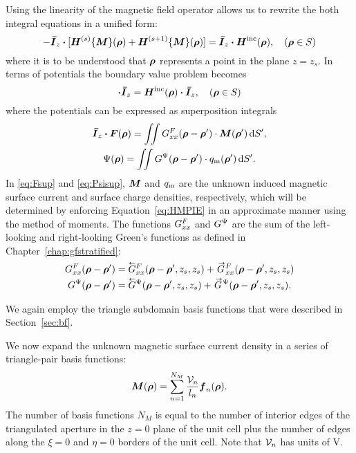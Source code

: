 Using the linearity of the magnetic field operator allows
us to rewrite the both integral equations in a unified form:
\begin{equation}
-\boldsymbol{\bar{I}}_z \boldsymbol{\cdot} [\boldsymbol{H}^{(s)}\{\boldsymbol{M}\}(\boldsymbol{\rho}) + 
\boldsymbol{H}^{(s+1)}\{\boldsymbol{M}\}(\boldsymbol{\rho})] = 
\boldsymbol{\bar{I}}_z \boldsymbol{\cdot} \boldsymbol{H}^{\text{inc}}(\boldsymbol{\rho}), \quad (\boldsymbol{\rho} \in S)
  \label{eq:MFIE}
\end{equation}
where it is to be understood that $\boldsymbol{\rho}$ represents a point in the
plane $z=z_s.$
In terms of potentials the boundary value problem becomes
\begin{equation}
  [-j\omega \F(\vecrho) + \gradient\Psi(\vecrho)] \bdot \Idemfactor_z = 
  \H\inc(\vecrho) \bdot \Idemfactor_z, \quad (\vecrho \in S)
  \label{eq:HMPIE}
\end{equation}
where the potentials can be expressed as superposition integrals
 \begin{gather}
   \boldsymbol{\bar{I}}_z \boldsymbol{\cdot} \boldsymbol{F}(\boldsymbol{\rho}) = 
   \iint G^F_{xx}(\boldsymbol{\rho}-\boldsymbol{\rho}') \cdot \boldsymbol{M}(\boldsymbol{\rho}') \, \text{d} S',
   \label{eq:Fsup}\\
   \Psi(\boldsymbol{\rho}) = \iint {G}^{\Psi}(\boldsymbol{\rho}-\boldsymbol{\rho}') \cdot q_{\text{m}}(\boldsymbol{\rho}') \, \text{d} S'.
   \label{eq:Psisup}
 \end{gather}
In \eqref{eq:Fsup} and \eqref{eq:Psisup}, $\boldsymbol{M}$ and $q_{\text{m}}$ are the unknown
induced magnetic surface current and surface charge densities,
respectively, which will be determined
by enforcing
Equation~\eqref{eq:HMPIE} in an approximate manner using the method of
moments. The functions $G^F_{xx}$ and ${G}^{\Psi}$ are the sum of the
left-looking and right-looking Green's functions as defined in 
Chapter~\ref{chap:gfstratified}:
\begin{subequations}
  \begin{align}
    \GFxx(\vecrho-\vecrho') &=
    \GlFxx(\vecrho-\vecrho',z_s,z_s) +
    \GrFxx(\vecrho-\vecrho',z_s,z_s) \\
    \GPsi(\vecrho-\vecrho') &=
    \GlPsi(\vecrho-\vecrho',z_s,z_s) +
    \GrPsi(\vecrho-\vecrho',z_s,z_s).
  \end{align}
\end{subequations}


 We again employ the triangle subdomain basis functions that
were described in Section~\ref{sec:bf}.

We now expand the unknown magnetic surface current density 
in a series of triangle-pair basis functions:
\begin{equation}
  \label{eq:Mexpand}
  \boldsymbol{M}(\boldsymbol{\rho}) =  \sum_{n=1}^{N_M} \frac{\mathcal{V}_n}{l_n} \boldsymbol{f}_n(\boldsymbol{\rho}).
\end{equation}
The number of basis functions
$N_M$ is equal to the number of interior edges of the triangulated aperture in the
$z=0$ plane of the unit cell plus the number of edges along the $\xi=0$ and $\eta=0$
borders of the unit cell.  Note that $\mathcal{V}_n$ has units of \si{V}.



